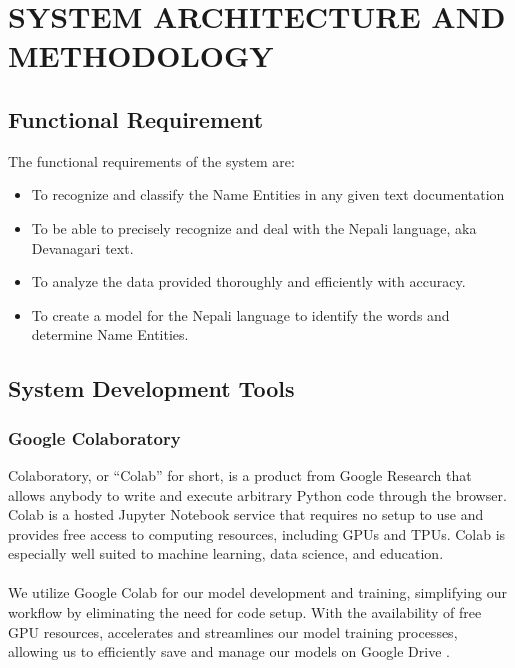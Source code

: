 \chapter{SYSTEM ARCHITECTURE AND METHODOLOGY}

 
\vspace{10pt} %

\section{Functional Requirement}

The functional requirements of the system are:
\begin{itemize}
  \item  To recognize and classify the Name Entities in any 
         given text documentation
  \item  To be able to precisely recognize and deal with the 
         Nepali language, aka     Devanagari text.
  \item  To analyze the data provided thoroughly and 
        efficiently with accuracy.
  \item To create a model for the Nepali language to identify 
        the words and determine Name Entities.
\end{itemize}

\section{System Development Tools}
\subsection{Google Colaboratory}
Colaboratory, or “Colab” for short, is a product from Google Research that allows anybody to write and execute arbitrary Python code through the browser. Colab is a hosted Jupyter Notebook service that requires no setup to use and provides free access to computing resources, including GPUs and TPUs. Colab is especially well suited to machine learning, data science, and education. \\
\\
We utilize Google Colab for our model development and training, simplifying our workflow by eliminating the need for code setup. With the availability of free GPU resources, accelerates and streamlines our model training processes, allowing us to efficiently save and manage our models on Google Drive \cite{colab}. 


